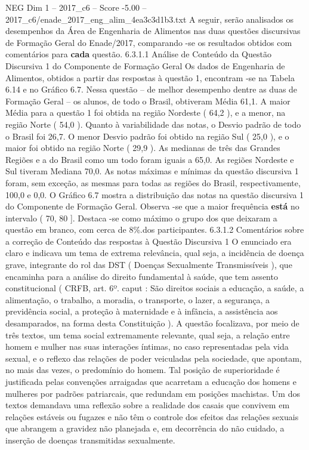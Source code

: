 \begin{textsample}{NEG Dim 1 – 2017\_c6 – Score -5.00 – 2017\_c6/enade\_2017\_eng\_alim\_4ea3c3d1b3.txt}
A seguir, serão analisados os desempenhos da Área de Engenharia de Alimentos nas duas questões discursivas de Formação Geral do Enade/2017, comparando -se os resultados obtidos com comentários para \textbf{cada} questão. 6.3.1.1 Análise de Conteúdo da Questão Discursiva 1 do Componente de Formação Geral Os dados de Engenharia de Alimentos, obtidos a partir das respostas à questão 1, encontram -se na Tabela 6.14 e no Gráfico 6.7.
Nessa questão – de melhor desempenho dentre as duas de Formação Geral – os alunos, de todo o Brasil, obtiveram Média 61,1.
A maior Média para a questão 1 foi obtida na região Nordeste ( 64,2 ), e a menor, na região Norte ( 54,0 ).
Quanto à variabilidade das notas, o Desvio padrão de todo o Brasil foi 26,7.
O menor Desvio padrão foi obtido na região Sul ( 25,0 ), e o maior foi obtido na região Norte ( 29,9 ).
As medianas de três das Grandes Regiões e a do Brasil como um todo foram iguais a 65,0.
As regiões Nordeste e Sul tiveram Mediana 70,0.
As notas máximas e mínimas da questão discursiva 1 foram, sem exceção, as mesmas para todas as regiões do Brasil, respectivamente, 100,0 e 0,0.
O Gráfico 6.7 mostra a distribuição das notas na questão discursiva 1 do Componente de Formação Geral.
Observa -se que a maior frequência \textbf{está} no intervalo ( 70, 80 ].
Destaca -se como máximo o grupo dos que deixaram a questão em branco, com cerca de 8\%.dos participantes. 6.3.1.2 Comentários sobre a correção de Conteúdo das respostas à Questão Discursiva 1 O enunciado era claro e indicava um tema de extrema relevância, qual seja, a incidência de doença grave, integrante do rol das DST ( Doenças Sexualmente Transmissíveis ), que encaminha para a análise do direito fundamental à saúde, que tem assento constitucional ( CRFB, art. 6º. caput : São direitos sociais a educação, a saúde, a alimentação, o trabalho, a moradia, o transporte, o lazer, a segurança, a previdência social, a proteção à maternidade e à infância, a assistência aos desamparados, na forma desta Constituição ).
A questão focalizava, por meio de três textos, um tema social extremamente relevante, qual seja, a relação entre homem e mulher nas suas interações íntimas, no caso representadas pela vida sexual, e o reflexo das relações de poder veiculadas pela sociedade, que apontam, no mais das vezes, o predomínio do homem.
Tal posição de superioridade é justificada pelas convenções arraigadas que acarretam a educação dos homens e mulheres por padrões patriarcais, que redundam em posições machistas.
Um dos textos demandava uma reflexão sobre a realidade dos casais que convivem em relações estáveis ou fugazes e não têm o controle dos efeitos das relações sexuais que abrangem a gravidez não planejada e, em decorrência do não cuidado, a inserção de doenças transmitidas sexualmente.

\end{textsample}

